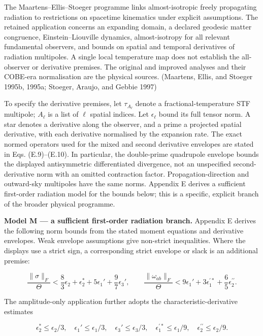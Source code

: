 \documentclass[
  11pt,
  a4paper]{article}
\begin{document}
The Maartens--Ellis--Stoeger programme links almost-isotropic freely propagating radiation to restrictions on spacetime kinematics under explicit assumptions. The retained application concerns an expanding domain, a declared geodesic matter congruence, Einstein--Liouville dynamics, almost-isotropy for all relevant fundamental observers, and bounds on spatial and temporal derivatives of radiation multipoles. A single local temperature map does not establish the all-observer or derivative premises. The original and improved analyses and their COBE-era normalisation are the physical sources. (Maartens, Ellis, and Stoeger 1995b, 1995a; Stoeger, Araujo, and Gebbie 1997)

To specify the derivative premises, let \(\tau_{A_\ell}\) denote a fractional-temperature STF multipole; \(A_\ell\) is a list of \(\ell\) spatial indices. Let \(\epsilon_\ell\) bound its full tensor norm. A star denotes a derivative along the observer, and a prime a projected spatial derivative, with each derivative normalised by the expansion rate. The exact normed operators used for the mixed and second derivative envelopes are stated in Eqs. (E.9)--(E.10). In particular, the double-prime quadrupole envelope bounds the displayed antisymmetric differentiated divergence, not an unspecified second-derivative norm with an omitted contraction factor. Propagation-direction and outward-sky multipoles have the same norms. Appendix E derives a sufficient first-order radiation model for the bounds below; this is a specific, explicit branch of the broader physical programme.

\textbf{Model M --- a sufficient first-order radiation branch.} Appendix E derives the following norm bounds from the stated moment equations and derivative envelopes. Weak envelope assumptions give non-strict inequalities. Where the displays use a strict sign, a corresponding strict envelope or slack is an additional premise:

\[
\frac{\|\sigma\|_F}{\Theta}
<\frac83\epsilon_2+\epsilon_2^*+5\epsilon_1'
+\frac97\epsilon_3',
\qquad
\frac{\|\omega_{ab}\|_F}{\Theta}
<9\epsilon_1'+3\epsilon_1^{\prime *}+\frac65\epsilon_2^{\prime\prime}.
\tag{6.1}
\]

The amplitude-only application further adopts the characteristic-derivative estimates

\[
\epsilon_2^*\le\epsilon_2/3,\quad
\epsilon_1'\le\epsilon_1/3,\quad
\epsilon_3'\le\epsilon_3/3,\quad
\epsilon_1^{\prime *}\le\epsilon_1/9,\quad
\epsilon_2^{\prime\prime}\le\epsilon_2/9.
\tag{6.2}
\]
\end{document}
